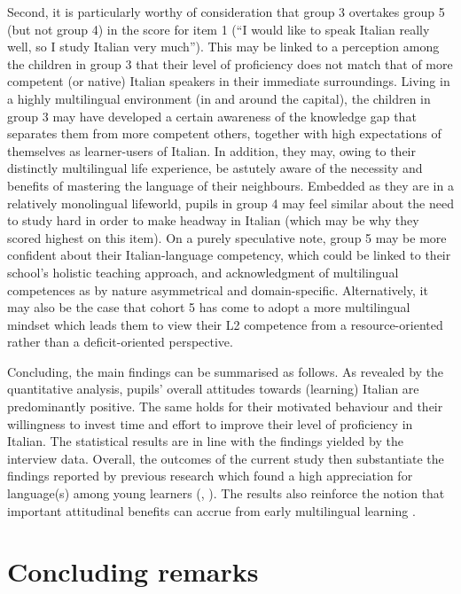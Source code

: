 \documentclass[output=paper]{../langscibook}
\begin{document}
Second, it is particularly worthy of consideration that group 3 overtakes group 5 (but not group 4) in the score for item 1 (``I would like to speak Italian really well, so I study Italian very much''). This may be linked to a perception among the children in group 3 that their level of proficiency does not match that of more competent (or native) Italian speakers in their immediate surroundings. Living in a highly multilingual environment (in and around the capital), the children in group 3 may have developed a certain awareness of the knowledge gap that separates them from more competent others, together with high expectations of themselves as learner-users of Italian. In addition, they may, owing to their distinctly multilingual life experience, be astutely aware of the necessity and benefits of mastering the language of their neighbours. Embedded as they are in a relatively monolingual lifeworld, pupils in group 4 may feel similar about the need to study hard in order to make headway in Italian (which may be why they scored highest on this item). On a purely speculative note, group 5 may be more confident about their Italian-language competency, which could be linked to their school’s holistic teaching approach, and acknowledgment of multilingual competences as by nature asymmetrical and domain-specific. Alternatively, it may also be the case that cohort 5 has come to adopt a more multilingual mindset which leads them to view their L2 competence from a resource-oriented rather than a deficit-oriented perspective.

Concluding, the main findings can be summarised as follows. As revealed by the quantitative analysis, pupils’ overall attitudes towards (learning) Italian are predominantly positive. The same holds for their motivated behaviour and their willingness to invest time and effort to improve their level of proficiency in Italian. The statistical results are in line with the findings yielded by the interview data. Overall, the outcomes of the current study then substantiate the findings reported by previous research which found a high appreciation for language(s) among young learners (\citealt{Nikolov1999}, \citealt{Shameem2004}). The results also reinforce the notion that important attitudinal benefits can accrue from early multilingual learning \citep{Helot2008}.

\section{Concluding remarks}
\end{document}

